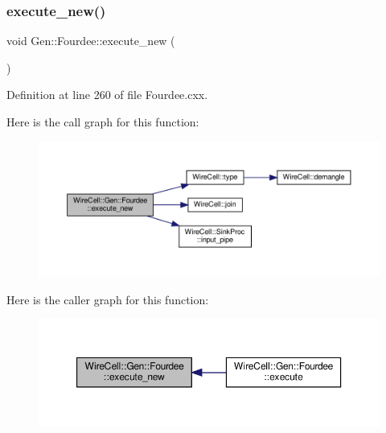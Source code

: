 \subsubsection{\texorpdfstring{execute\+\_\+new()}{execute\_new()}}
{\footnotesize\ttfamily void Gen\+::\+Fourdee\+::execute\+\_\+new (\begin{DoxyParamCaption}{ }\end{DoxyParamCaption})\hspace{0.3cm}{\ttfamily [virtual]}}



Definition at line 260 of file Fourdee.\+cxx.

Here is the call graph for this function\+:
\nopagebreak
\begin{figure}[H]
\begin{center}
\leavevmode
\includegraphics[width=350pt]{class_wire_cell_1_1_gen_1_1_fourdee_a316c2ab798af8812a737b05ad5a788ae_cgraph}
\end{center}
\end{figure}
Here is the caller graph for this function\+:
\nopagebreak
\begin{figure}[H]
\begin{center}
\leavevmode
\includegraphics[width=350pt]{class_wire_cell_1_1_gen_1_1_fourdee_a316c2ab798af8812a737b05ad5a788ae_icgraph}
\end{center}
\end{figure}
\mbox{\label{class_wire_cell_1_1_gen_1_1_fourdee_a2a79017c41d76c2cd942ba1c87eb3106}} 
